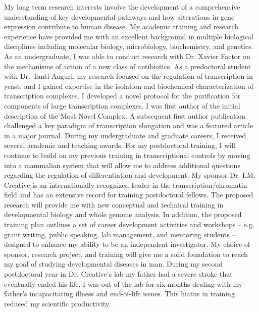 \documentclass{nihbiosketch}
\begin{document}
\begin{statement}
My long term research interests involve the development of a comprehensive understanding of key developmental pathways and how alterations in gene expression contribute to human disease. My academic training and research experience have provided me with an excellent background in multiple biological disciplines including molecular biology, microbiology, biochemistry, and genetics. As an undergraduate, I was able to conduct research with Dr. Xavier Factor on the mechanisms of action of a new class of antibiotics. As a predoctoral student with Dr. Tanti Auguri, my research focused on the regulation of transcription in yeast, and I gained expertise in the isolation and biochemical characterization of transcription complexes. I developed a novel protocol for the purification for components of large transcription complexes. I was first author of the initial description of the Most Novel Complex. A subsequent first author publication challenged a key paradigm of transcription elongation and was a featured article in a major journal. During my undergraduate and graduate careers, I received several academic and teaching awards. For my postdoctoral training, I will continue to build on my previous training in transcriptional controls by moving into a mammalian system that will allow me to address additional questions regarding the regulation of differentiation and development. My sponsor Dr. I.M. Creative is an internationally recognized leader in the transcription/chromatin field and has an extensive record for training postdoctoral fellows. The proposed research will provide me with new conceptual and technical training in developmental biology and whole genome analysis. In addition, the proposed training plan outlines a set of career development activities and workshops -- e.g. grant writing, public speaking, lab management, and mentoring students -- designed to enhance my ability to be an independent investigator. My choice of sponsor, research project, and training will give me a solid foundation to reach my goal of studying developmental diseases in man. During my second postdoctoral year in Dr. Creative's lab my father had a severe stroke that eventually ended his life. I was out of the lab for six months dealing with my father's incapacitating illness and end-of-life issues. This hiatus in training reduced my scientific productivity.


\end{statement}
\end{document}
